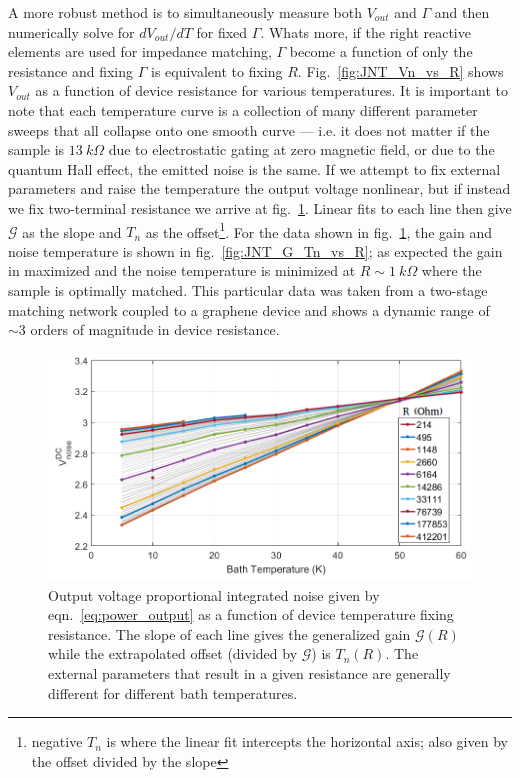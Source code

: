 A more robust method is to simultaneously measure both $V_{out}$ and $\Gamma$ and then numerically solve for $dV_{out}/dT$ for fixed $\Gamma$. Whats more, if the right reactive elements are used for impedance matching, $\Gamma$ become a function of only the resistance and fixing $\Gamma$ is equivalent to fixing $R$. Fig.~\ref{fig:JNT_Vn_vs_R} shows $V_{out}$ as a function of device resistance for various temperatures. It is important to note that each temperature curve is a collection of many different parameter sweeps that all collapse onto one smooth curve --- i.e. it does not matter if the sample is $13~k\Omega$ due to electrostatic gating at zero magnetic field, or due to the quantum Hall effect, the emitted noise is the same. If we attempt to fix external parameters and raise the temperature the output voltage nonlinear, but if instead we fix two-terminal resistance we arrive at fig.~\ref{fig:JNT_Vn_vs_T}. Linear fits to each line then give $\mathcal{G}$ as the slope and $T_n$ as the offset\footnote{negative $T_n$ is where the linear fit intercepts the horizontal axis; also given by the offset divided by the slope}. For the data shown in fig.~\ref{fig:JNT_Vn_vs_T}, the gain and noise temperature is shown in fig.~\ref{fig:JNT_G_Tn_vs_R}; as expected the gain in maximized and the noise temperature is minimized at $R\sim 1~k\Omega$ where the sample is optimally matched. This particular data was taken from a two-stage matching network coupled to a graphene device and shows a dynamic range of ${\sim}3$ orders of magnitude in device resistance.
\begin{figure}
\centering
\includegraphics[width = 130mm]{figures/Johnson_noise_thermometry/Vn_vs_T}
\caption{Output voltage proportional integrated noise given by eqn.~\ref{eq:power_output} as a function of device temperature fixing resistance. The slope of each line gives the generalized gain $\mathcal{G}(R)$ while the extrapolated offset (divided by $\mathcal{G}$) is $T_n(R)$. The external parameters that result in a given resistance are generally different for different bath temperatures.}
\label{fig:JNT_Vn_vs_T}
\end{figure}
